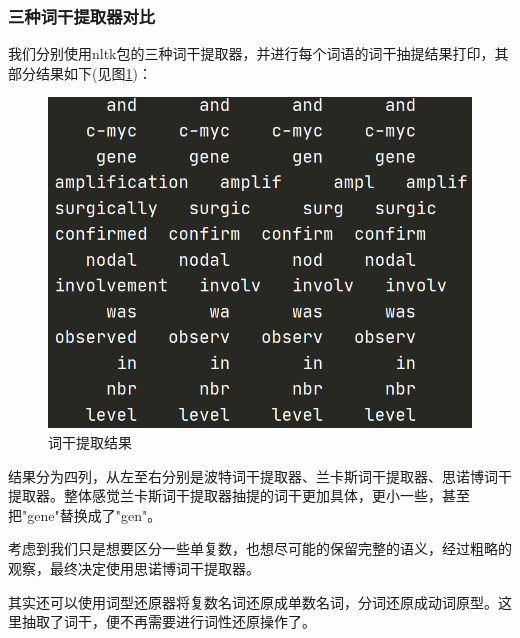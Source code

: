 \documentclass{article}
\begin{document}
\subsubsection{三种词干提取器对比}
我们分别使用nltk包的三种词干提取器，并进行每个词语的词干抽提结果打印，其部分结果如下(见图\ref{xxxxxxx})：
\begin{figure}[H]
  \centering
  \includegraphics[scale=0.5]{./picture/词干提取.png} %
  \caption{词干提取结果} %
  \label{xxxxxxx} %
\end{figure}
结果分为四列，从左至右分别是波特词干提取器、兰卡斯词干提取器、思诺博词干提取器。整体感觉兰卡斯词干提取器抽提的词干更加具体，更小一些，甚至把"gene"替换成了"gen"。\par
考虑到我们只是想要区分一些单复数，也想尽可能的保留完整的语义，经过粗略的观察，最终决定使用思诺博词干提取器。\par
其实还可以使用词型还原器将复数名词还原成单数名词，分词还原成动词原型。这里抽取了词干，便不再需要进行词性还原操作了。
\end{document}
